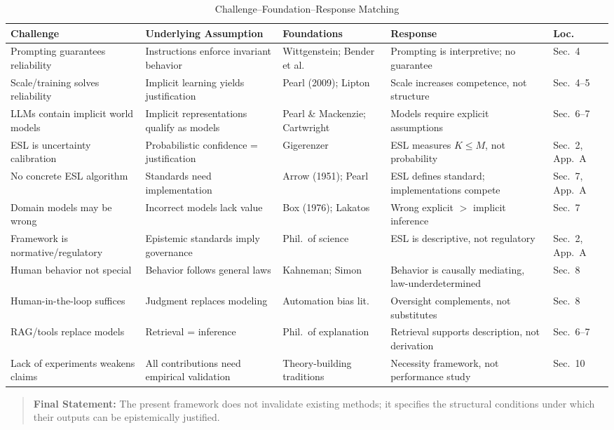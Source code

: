 \begin{table}[htbp]
\centering
\small
\caption{Challenge--Foundation--Response Matching}
\label{tab:challenge-response}
\begin{tabular}{p{3.2cm}p{3.2cm}p{2.8cm}p{3.2cm}p{1.2cm}}
\toprule
\textbf{Challenge} & \textbf{Underlying Assumption} & \textbf{Foundations} & \textbf{Response} & \textbf{Loc.} \\
\midrule
Prompting guarantees reliability & Instructions enforce invariant behavior & Wittgenstein; Bender et al. & Prompting is interpretive; no guarantee & Sec.~4 \\
\addlinespace
Scale/training solves reliability & Implicit learning yields justification & Pearl (2009); Lipton & Scale increases competence, not structure & Sec.~4--5 \\
\addlinespace
LLMs contain implicit world models & Implicit representations qualify as models & Pearl \& Mackenzie; Cartwright & Models require explicit assumptions & Sec.~6--7 \\
\addlinespace
ESL is uncertainty calibration & Probabilistic confidence = justification & Gigerenzer & ESL measures $K \le M$, not probability & Sec.~2, App.~A \\
\addlinespace
No concrete ESL algorithm & Standards need implementation & Arrow (1951); Pearl & ESL defines standard; implementations compete & Sec.~7, App.~A \\
\addlinespace
Domain models may be wrong & Incorrect models lack value & Box (1976); Lakatos & Wrong explicit $>$ implicit inference & Sec.~7 \\
\addlinespace
Framework is normative/regulatory & Epistemic standards imply governance & Phil.\ of science & ESL is descriptive, not regulatory & Sec.~2, App.~A \\
\addlinespace
Human behavior not special & Behavior follows general laws & Kahneman; Simon & Behavior is causally mediating, law-underdetermined & Sec.~8 \\
\addlinespace
Human-in-the-loop suffices & Judgment replaces modeling & Automation bias lit. & Oversight complements, not substitutes & Sec.~8 \\
\addlinespace
RAG/tools replace models & Retrieval = inference & Phil.\ of explanation & Retrieval supports description, not derivation & Sec.~6--7 \\
\addlinespace
Lack of experiments weakens claims & All contributions need empirical validation & Theory-building traditions & Necessity framework, not performance study & Sec.~10 \\
\bottomrule
\end{tabular}
\end{table}

\begin{quote}
\textbf{Final Statement:} The present framework does not invalidate existing methods; it specifies the structural conditions under which their outputs can be epistemically justified.
\end{quote}
